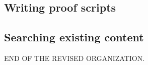 \subsection{Writing proof scripts}


\subsection{Searching existing content}

END OF THE REVISED ORGANIZATION.

%
%
%
%
%
%
%
